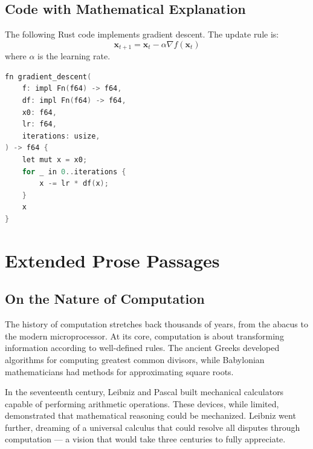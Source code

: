 \documentclass[11pt]{article}
\begin{document}
\subsection{Code with Mathematical Explanation}

The following Rust code implements gradient descent. The update rule is:
\begin{equation}
  \mathbf{x}_{t+1} = \mathbf{x}_t - \alpha \nabla f(\mathbf{x}_t)
\end{equation}
where $\alpha$ is the learning rate.

\begin{lstlisting}[language=C, caption={Gradient descent implementation}]
fn gradient_descent(
    f: impl Fn(f64) -> f64,
    df: impl Fn(f64) -> f64,
    x0: f64,
    lr: f64,
    iterations: usize,
) -> f64 {
    let mut x = x0;
    for _ in 0..iterations {
        x -= lr * df(x);
    }
    x
}
\end{lstlisting}

\lipsum[13-14]

\newpage

\section{Extended Prose Passages}
\label{sec:prose}

\subsection{On the Nature of Computation}

The history of computation stretches back thousands of years, from the abacus
to the modern microprocessor. At its core, computation is about transforming
information according to well-defined rules. The ancient Greeks developed
algorithms for computing greatest common divisors, while Babylonian
mathematicians had methods for approximating square roots.

In the seventeenth century, Leibniz and Pascal built mechanical calculators
capable of performing arithmetic operations. These devices, while limited,
demonstrated that mathematical reasoning could be mechanized. Leibniz went
further, dreaming of a universal calculus that could resolve all disputes
through computation --- a vision that would take three centuries to fully
appreciate.
\end{document}
